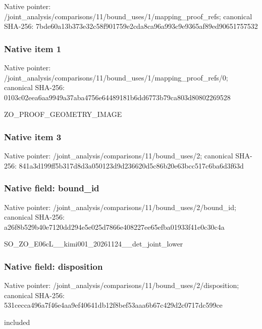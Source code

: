 \documentclass[10pt,a4paper]{article}
\begin{document}
Native pointer: /joint\_analysis/comparis\allowbreak{}ons/11/bound\_uses/1/mapp\allowbreak{}ing\_proof\_refs; canonical SHA-256: 7bde60a13b373e32c58f9017\allowbreak{}59e2cda8ca96a993c9e9365a\allowbreak{}f89ed90651757532



\subsubsection{Native item 1}


Native pointer: /joint\_analysis/comparis\allowbreak{}ons/11/bound\_uses/1/mapp\allowbreak{}ing\_proof\_refs/0; canonical SHA-256: 0103c02eea6aa9949a37aba4\allowbreak{}756e64489181b6dd6773b79c\allowbreak{}a803d80802269528


ZO\_PROOF\_GEOMETRY\_IMAGE


\subsubsection{Native item 3}


Native pointer: /joint\_analysis/comparis\allowbreak{}ons/11/bound\_uses/2; canonical SHA-256: 841a3d199ff5b317d8d3a050\allowbreak{}123d9d236620d5c86b20e63b\allowbreak{}cc517c6ba6d3f63d



\subsubsection{Native field: bound\_id}


Native pointer: /joint\_analysis/comparis\allowbreak{}ons/11/bound\_uses/2/boun\allowbreak{}d\_id; canonical SHA-256: a26f8b529b40e7120dd294e5\allowbreak{}e025d7866e408227ee65efba\allowbreak{}01933f41e0c30c4a


SO\_ZO\_E06cL\_\_kimi001\_202\allowbreak{}61124\_\_det\_joint\_lower


\subsubsection{Native field: disposition}


Native pointer: /joint\_analysis/comparis\allowbreak{}ons/11/bound\_uses/2/disp\allowbreak{}osition; canonical SHA-256: 531cecca496a7f46e4aa9ef4\allowbreak{}0641db12f8bef53aaa6b67c4\allowbreak{}29d2c0717dc599ce


included
\end{document}
